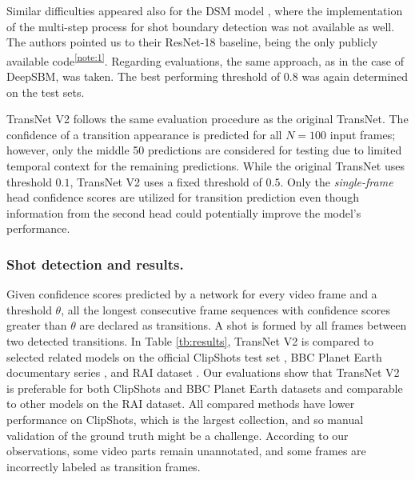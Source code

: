 \documentclass[sigconf]{acmart}
\begin{document}
Similar difficulties appeared also for the DSM model \cite{Tang2018clipshots}, where the implementation of the multi-step process for shot boundary detection was not available as well. The authors pointed us to their ResNet-18 baseline, being the only publicly available code\textsuperscript{\ref{note:1}}. Regarding evaluations, the same approach, as in the case of DeepSBM, was taken. The best performing threshold of $0.8$ was again determined on the test sets.

TransNet V2 follows the same evaluation procedure as the original TransNet. The confidence of a transition appearance is predicted for all $N=100$ input frames; however, only the middle 50 predictions are considered for testing due to limited temporal context for the remaining predictions. While the original TransNet uses threshold $0.1$, TransNet V2 uses a fixed threshold of $0.5$. Only the \textit{single-frame} head confidence scores are utilized for transition prediction even though information from the second head could potentially improve the model's performance.

\subsubsection{Shot detection and results.}
Given confidence scores predicted by a network for every video frame and a threshold $\theta$, all the longest consecutive frame sequences with confidence scores greater than $\theta$ are declared as transitions. A shot is formed by all frames between two detected transitions.
In Table \ref{tb:results}, TransNet V2 is compared to selected related models on the official ClipShots test set \cite{Tang2018clipshots}, BBC Planet Earth documentary series \cite{Baraldi2015SceneSiamDet_BBC}, and RAI dataset \cite{Baraldi15RAI}. Our evaluations show that TransNet V2 is preferable for both ClipShots and BBC Planet Earth datasets and comparable to other models on the RAI dataset. All compared methods have lower performance on ClipShots, which is the largest collection, and so manual validation of the ground truth might be a challenge. According to our observations, some video parts remain unannotated, and some frames are incorrectly labeled as transition frames.
\end{document}
